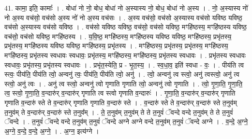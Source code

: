 \documentclass[17pt]{extarticle}
\begin{document}
41. कामा॒ इति॒ कामाः᳚ । . बोधा॑ नो नो॒ बोध॒ बोधा॑ नो अ॒स्यास्य नो॒ बोध॒ बोधा॑ नो अ॒स्य । . नो॒ अ॒स्यास्य नो॑ नो अ॒स्य वच॑सो॒ वच॑सो अ॒स्य नो॑ नो अ॒स्य वच॑सः । . अ॒स्य वच॑सो॒ वच॑सो अ॒स्यास्य वच॑सो यविष्ठ यविष्ठ॒ वच॑सो अ॒स्यास्य वच॑सो यविष्ठ । . वच॑सो यविष्ठ यविष्ठ॒ वच॑सो॒ वच॑सो यविष्ठ॒ मꣳहि॑ष्ठस्य॒ मꣳहि॑ष्ठस्य यविष्ठ॒ वच॑सो॒ वच॑सो यविष्ठ॒ मꣳहि॑ष्ठस्य । . य॒वि॒ष्ठ॒ मꣳहि॑ष्ठस्य॒ मꣳहि॑ष्ठस्य यविष्ठ यविष्ठ॒ मꣳहि॑ष्ठस्य॒ प्रभृ॑तस्य॒ प्रभृ॑तस्य॒ मꣳहि॑ष्ठस्य यविष्ठ यविष्ठ॒ मꣳहि॑ष्ठस्य॒ प्रभृ॑तस्य । . मꣳहि॑ष्ठस्य॒ प्रभृ॑तस्य॒ प्रभृ॑तस्य॒ मꣳहि॑ष्ठस्य॒ मꣳहि॑ष्ठस्य॒ प्रभृ॑तस्य स्वधावः स्वधावः॒ प्रभृ॑तस्य॒ मꣳहि॑ष्ठस्य॒ मꣳहि॑ष्ठस्य॒ प्रभृ॑तस्य स्वधावः । . प्रभृ॑तस्य स्वधावः स्वधावः॒ प्रभृ॑तस्य॒ प्रभृ॑तस्य स्वधावः । . प्रभृ॑त॒स्येति॒ प्र - भृ॒त॒स्य॒ । . स्व॒धा॒व॒ इति॑ स्वधा - वः॒ । . पीय॑ति त्व स्त्वः॒ पीय॑ति॒ पीय॑ति त्वो॒ अन्वनु॑ त्वः॒ पीय॑ति॒ पीय॑ति त्वो॒ अनु॑ । . त्वो॒ अन्वनु॑ त्व स्त्वो॒ अनु॑ त्वस्त्वो॒ अनु॑ त्व स्त्वो॒ अनु॑ त्वः । . अनु॑ त्व स्त्वो॒ अन्वनु॑ त्वो गृणाति गृणाति त्वो॒ अन्वनु॑ त्वो गृणाति । . त्वो॒ गृ॒णा॒ति॒ गृ॒णा॒ति॒ त्व॒ स्त्वो॒ गृ॒णा॒ति॒ व॒न्दारु॑र् व॒न्दारु॑र् गृणाति त्व स्त्वो गृणाति व॒न्दारुः॑ । . गृ॒णा॒ति॒ व॒न्दारु॑र् व॒न्दारु॑र् गृणाति गृणाति व॒न्दारु॑ स्ते ते व॒न्दारु॑र् गृणाति गृणाति व॒न्दारु॑ स्ते । . व॒न्दारु॑ स्ते ते व॒न्दारु॑र् व॒न्दारु॑ स्ते त॒नुव॑म् त॒नुव॑म् ते व॒न्दारु॑र् व॒न्दारु॑ स्ते त॒नुव᳚म् । . ते॒ त॒नुव॑म् त॒नुव॑म् ते ते त॒नुवं॑ ॅवन्दे वन्दे त॒नुव॑म् ते ते त॒नुवं॑ ॅवन्दे । . त॒नुवं॑ ॅवन्दे वन्दे त॒नुव॑म् त॒नुवं॑ ॅवन्दे अग्ने अग्ने वन्दे त॒नुव॑म् त॒नुवं॑ ॅवन्दे अग्ने । . व॒न्दे॒ अ॒ग्ने॒ अ॒ग्ने॒ व॒न्दे॒ व॒न्दे॒ अ॒ग्ने॒ । . अ॒ग्न॒ इत्य॑ग्ने । \newline
\end{document}
